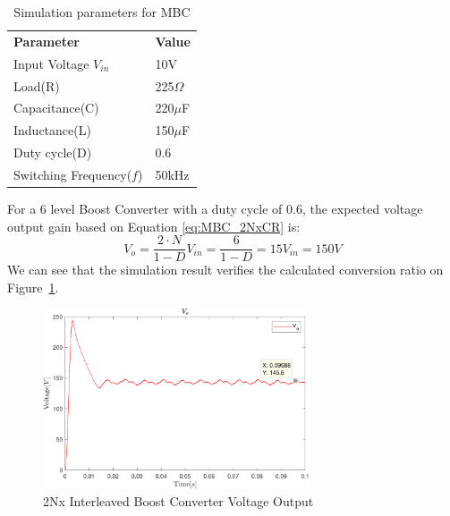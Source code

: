 \begin{table}[H]
\begin{center}
\caption {Simulation parameters for MBC} \label{tab:MBC_2Nx} 
\begin{tabular}{|l|l|}
\cline{1-2}
\textbf{Parameter} & \textbf{Value}  \\ \cline{1-2}
Input Voltage $V_{in}$          &      10V   \\ \cline{1-2}
Load(R)   & 225$\Omega$           \\ \cline{1-2}
Capacitance(C)          &       220$\mu$F     \\ \cline{1-2}
Inductance(L)          &      150$\mu$F      \\ \cline{1-2}
Duty cycle(D)          &     0.6       \\ \cline{1-2}
Switching Frequency($f$)          &      50kHz      \\ \cline{1-2}
\end{tabular}
\end{center}
\end{table} 
\vspace{-8mm}
For a 6 level Boost Converter with a duty cycle of 0.6, the expected voltage output gain based on Equation \ref{eq:MBC_2NxCR} is:
\begin{equation}
	V_o = \frac{2\cdot N}{1-D}V_{in} = \frac{6}{1-D}  = 15V_{in}=150V
\end{equation}
We can see that the simulation result verifies the calculated conversion ratio on Figure~\ref{fig:MBC_2NxSimResult}.\\
\vspace{-8mm}
\begin{figure}[H]
   \centering
   \includegraphics[width=0.7\textwidth]{figures/yy2NxMultilevelBC/2Nx_SimResults.pdf}
    \caption{2Nx Interleaved Boost Converter Voltage Output}
	\label{fig:MBC_2NxSimResult}
\end{figure}
\clearpage

